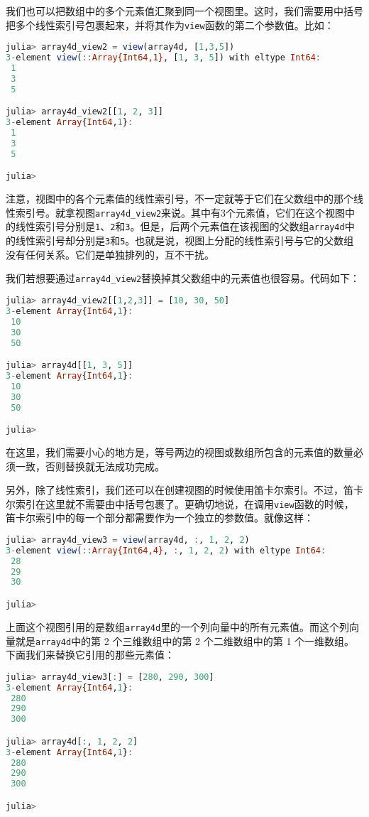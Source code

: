 我们也可以把数组中的多个元素值汇聚到同一个视图里。这时，我们需要用中括号把多个线性索引号包裹起来，并将其作为\verb|view|函数的第二个参数值。比如：

\begin{lstlisting}[language=julia]
julia> array4d_view2 = view(array4d, [1,3,5])
3-element view(::Array{Int64,1}, [1, 3, 5]) with eltype Int64:
 1
 3
 5

julia> array4d_view2[[1, 2, 3]]
3-element Array{Int64,1}:
 1
 3
 5

julia> 
\end{lstlisting}

注意，视图中的各个元素值的线性索引号，不一定就等于它们在父数组中的那个线性索引号。就拿视图\verb|array4d_view2|来说。其中有3个元素值，它们在这个视图中的线性索引号分别是\verb|1|、\verb|2|和\verb|3|。但是，后两个元素值在该视图的父数组\verb|array4d|中的线性索引号却分别是\verb|3|和\verb|5|。也就是说，视图上分配的线性索引号与它的父数组没有任何关系。它们是单独排列的，互不干扰。

我们若想要通过\verb|array4d_view2|替换掉其父数组中的元素值也很容易。代码如下：

\begin{lstlisting}[language=julia]
julia> array4d_view2[[1,2,3]] = [10, 30, 50]
3-element Array{Int64,1}:
 10
 30
 50

julia> array4d[[1, 3, 5]]
3-element Array{Int64,1}:
 10
 30
 50

julia> 
\end{lstlisting}

在这里，我们需要小心的地方是，等号两边的视图或数组所包含的元素值的数量必须一致，否则替换就无法成功完成。

另外，除了线性索引，我们还可以在创建视图的时候使用笛卡尔索引。不过，笛卡尔索引在这里就不需要由中括号包裹了。更确切地说，在调用\verb|view|函数的时候，笛卡尔索引中的每一个部分都需要作为一个独立的参数值。就像这样：

\begin{lstlisting}[language=julia]
julia> array4d_view3 = view(array4d, :, 1, 2, 2)
3-element view(::Array{Int64,4}, :, 1, 2, 2) with eltype Int64:
 28
 29
 30

julia>  
\end{lstlisting}

上面这个视图引用的是数组\verb|array4d|里的一个列向量中的所有元素值。而这个列向量就是\verb|array4d|中的第 2 个三维数组中的第 2 个二维数组中的第 1 个一维数组。下面我们来替换它引用的那些元素值：

\begin{lstlisting}[language=julia]
julia> array4d_view3[:] = [280, 290, 300]
3-element Array{Int64,1}:
 280
 290
 300

julia> array4d[:, 1, 2, 2]
3-element Array{Int64,1}:
 280
 290
 300

julia> 
\end{lstlisting}

